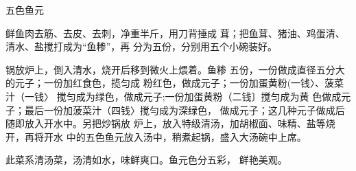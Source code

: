 \begin{recipe}[五福鱼元]{五色鱼元}

\ingredients


\cooking

\step 	鲜鱼肉去筋、去皮、去刺，净重半斤，用刀背捶成 茸；把鱼茸、猪油、鸡蛋清、清水、盐搅打成为“鱼糁”，再 分为五份，分别用五个小碗装好。

\step 	锅放炉上，倒入清水，烧开后移到微火上煨着。鱼糁 五份，一份做成直径五分大的元子；一份加红食色，揽匀成 粉红色，做成元子；一份加蛋黄粉(一钱〉、菠菜汁（一钱〉 搅匀成为绿色，做成元子;一份加蛋黄粉（二钱〕搅匀成为黄 色做成元子；最后一份加菠菜汁（四钱〉搅勻成为深绿色， 做成元子；这几种元子做成后随即放入开水中。另把炒锅放 炉上，放入特级清汤，加胡椒面、味精、盐等烧开，再将开水 中的五色鱼元放入汤中，稍煮起锅，盛入大汤碗中上席。

\notes

此菜系清汤菜，汤清如水，味鲜爽口。鱼元色分五彩， 鲜艳美观。

\end{recipe}


